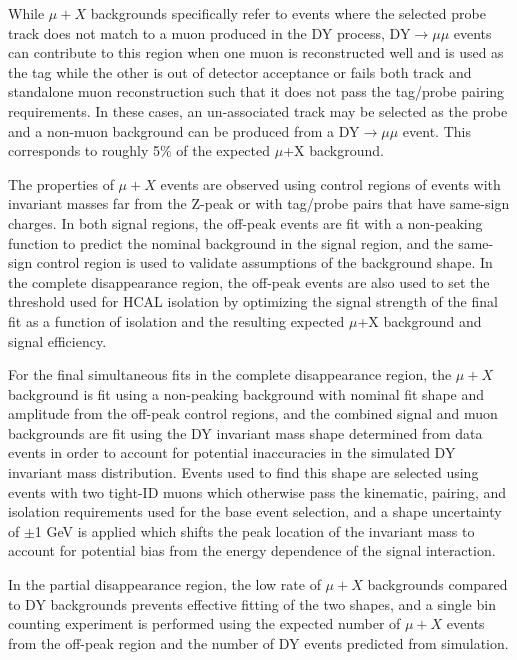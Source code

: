 While $\mu+X$ backgrounds specifically refer to events where the selected probe track does not match to a muon produced in the DY process, DY$\rightarrow\mu\mu$ events can contribute to this region when one muon is reconstructed well and is used as the tag while the other is out of detector acceptance or fails both track and standalone muon reconstruction such that it does not pass the tag/probe pairing requirements. 
In these cases, an un-associated track may be selected as the probe and a non-muon background can be produced from a DY$\rightarrow\mu\mu$ event. 
This corresponds to roughly 5$\%$ of the expected $\mu$+X background.

The properties of $\mu+X$ events are observed using control regions of events with invariant masses far from the Z-peak or with tag/probe pairs that have same-sign charges.
In both signal regions, the off-peak events are fit with a non-peaking function to predict the nominal background in the signal region, and the same-sign control region is used to validate assumptions of the background shape.
In the complete disappearance region, the off-peak events are also used to set the threshold used for HCAL isolation by optimizing the signal strength of the final fit as a function of isolation and the resulting expected $\mu$+X background and signal efficiency.

For the final simultaneous fits in the complete disappearance region, the $\mu+X$ background is fit using a non-peaking background with nominal fit shape and amplitude from the off-peak control regions, and the combined signal and muon backgrounds are fit using the DY invariant mass shape determined from data events in order to account for potential inaccuracies in the simulated DY invariant mass distribution.
Events used to find this shape are selected using events with two tight-ID muons which otherwise pass the kinematic, pairing, and isolation requirements used for the base event selection, and a shape uncertainty of $\pm$1 GeV is applied which shifts the peak location of the invariant mass to account for potential bias from the energy dependence of the signal interaction.

In the partial disappearance region, the low rate of $\mu+X$ backgrounds compared to DY backgrounds prevents effective fitting of the two shapes, and a single bin counting experiment is performed using the expected number of $\mu+X$ events from the off-peak region and the number of DY events predicted from simulation.

